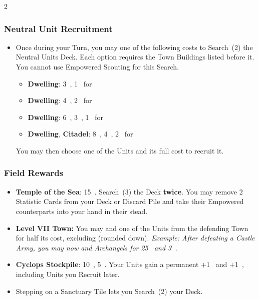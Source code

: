 \begin{multicols}{2}
\subsubsection*{Neutral Unit Recruitment}

\begin{itemize}
  \item Once during your Turn, you may  one of the following costs to Search~(2) the Neutral Units Deck.
    Each option requires the Town Buildings listed before it.
    You cannot use Empowered Scouting for this Search.
    \begin{itemize}
      \item {} \textbf{Dwelling}: 3~, 1~ for 
      \item {} \textbf{Dwelling}: 4~, 2~ for 
      \item {} \textbf{Dwelling}: 6~, 3~, 1~ for 
      \item {} \textbf{Dwelling}, \textbf{Citadel}: 8~, 4~, 2~ for 
    \end{itemize}
    You may then choose one of the Units and  its full cost to recruit it.
\end{itemize}

\subsubsection*{Field Rewards}

\begin{itemize}
  \item \textbf{Temple of the Sea}: 15~.
    Search~(3) the  Deck \textbf{twice}.
    You may remove 2 Statistic Cards from your Deck or Discard Pile and take their Empowered counterparts into your hand in their stead. \columnbreak
  \item \textbf{Level VII Town:} You may  and  one of the Units from the defending Town for half its cost, excluding  (rounded down). \textit{Example: After defeating a Castle Army, you may now  and  Archangels for 25~ and 3~.}
  \item \textbf{Cyclops Stockpile}: 10~, 5~. Your Units gain a permanent +1~ and +1~, including Units you Recruit later.
  \item Stepping on a Sanctuary Tile lets you Search~(2) your Deck.
\end{itemize}



\end{multicols}
